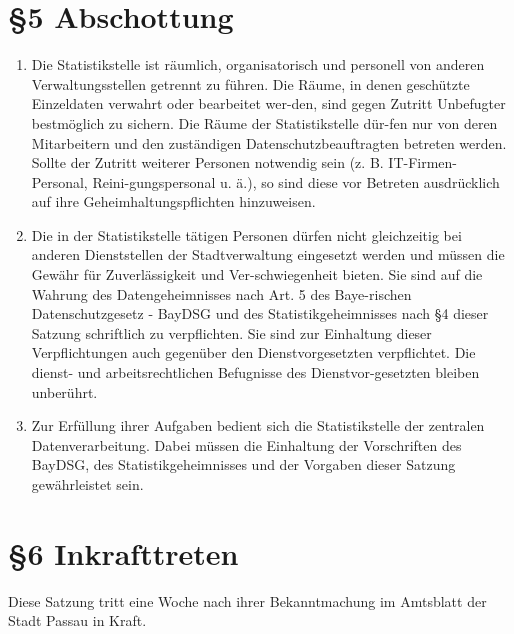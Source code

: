   \section{\S5 Abschottung}
    \begin{enumerate}[label=(\arabic*)]
      \item Die Statistikstelle ist räumlich, organisatorisch und personell von anderen Verwaltungsstellen getrennt zu führen. Die Räume, in denen geschützte Einzeldaten verwahrt oder bearbeitet wer-den, sind gegen Zutritt Unbefugter bestmöglich zu sichern. Die Räume der Statistikstelle dür-fen nur von deren Mitarbeitern und den zuständigen Datenschutzbeauftragten betreten werden. Sollte der Zutritt weiterer Personen notwendig sein (z. B. IT-Firmen-Personal, Reini-gungspersonal u. ä.), so sind diese vor Betreten ausdrücklich auf ihre Geheimhaltungspflichten hinzuweisen. 
      \item Die in der Statistikstelle tätigen Personen dürfen nicht gleichzeitig bei anderen Dienststellen der Stadtverwaltung eingesetzt werden und müssen die Gewähr für Zuverlässigkeit und Ver-schwiegenheit bieten. Sie sind auf die Wahrung des Datengeheimnisses nach Art. 5 des Baye-rischen Datenschutzgesetz - BayDSG und des Statistikgeheimnisses nach \S 4 dieser Satzung schriftlich zu verpflichten. Sie sind zur Einhaltung dieser Verpflichtungen auch gegenüber den Dienstvorgesetzten verpflichtet. Die dienst- und arbeitsrechtlichen Befugnisse des Dienstvor-gesetzten bleiben unberührt. 
      \item Zur Erfüllung ihrer Aufgaben bedient sich die Statistikstelle der zentralen Datenverarbeitung. Dabei müssen die Einhaltung der Vorschriften des BayDSG, des Statistikgeheimnisses und der Vorgaben dieser Satzung gewährleistet sein. 
    \end{enumerate}
    
    \section{\S6 Inkrafttreten}
    Diese Satzung tritt eine Woche nach ihrer Bekanntmachung im Amtsblatt der Stadt Passau in Kraft.